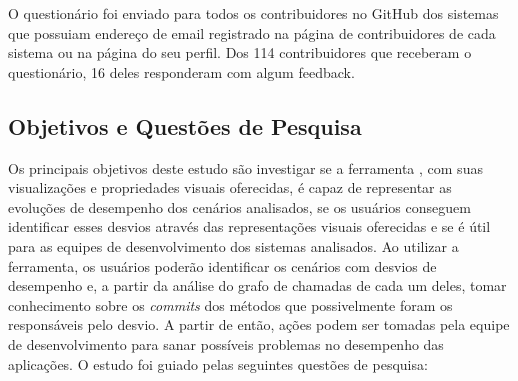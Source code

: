 O questionário foi enviado para todos os contribuidores no GitHub dos sistemas que possuiam endereço de email registrado na página de contribuidores de cada sistema ou na página do seu perfil. Dos 114 contribuidores que receberam o questionário, 16 deles responderam com algum feedback.

\subsection{Objetivos e Questões de Pesquisa} \label{subsec:avaliacao-objetivos-questoes-pesquisa}

Os principais objetivos deste estudo são investigar se a ferramenta \textit{\toolName}, com suas visualizações e propriedades visuais oferecidas, é capaz de representar as evoluções de desempenho dos cenários analisados, se os usuários conseguem identificar esses desvios através das representações visuais oferecidas e se é útil para as equipes de desenvolvimento dos sistemas analisados. Ao utilizar a ferramenta, os usuários poderão identificar os cenários com desvios de desempenho e, a partir da análise do grafo de chamadas de cada um deles, tomar conhecimento sobre os \textit{commits} dos métodos que possivelmente foram os responsáveis pelo desvio. A partir de então, ações podem ser tomadas pela equipe de desenvolvimento para sanar possíveis problemas no desempenho das aplicações. O estudo foi guiado pelas seguintes questões de pesquisa:

